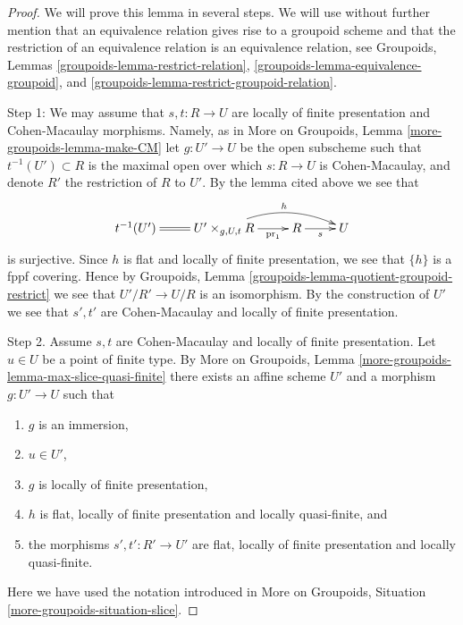 \begin{proof}
We will prove this lemma in several steps. We will use without further
mention that an equivalence relation gives rise to a groupoid scheme
and that the restriction of an equivalence relation is an equivalence
relation, see
Groupoids, Lemmas
\ref{groupoids-lemma-restrict-relation},
\ref{groupoids-lemma-equivalence-groupoid}, and
\ref{groupoids-lemma-restrict-groupoid-relation}.

\medskip\noindent
Step 1: We may assume that $s, t : R \to U$ are locally of finite presentation
and Cohen-Macaulay morphisms. Namely, as in
More on Groupoids, Lemma \ref{more-groupoids-lemma-make-CM}
let $g : U' \to U$ be the open subscheme such that
$t^{-1}(U') \subset R$ is the maximal open over which $s : R \to U$ is
Cohen-Macaulay, and denote $R'$ the restriction of $R$ to $U'$.
By the lemma cited above we see that
$$
\xymatrix{
t^{-1}(U') \ar@{=}[r] &
U' \times_{g, U, t} R \ar[r]_-{\text{pr}_1} \ar@/^3ex/[rr]^h &
R \ar[r]_s &
U
}
$$
is surjective. Since $h$ is flat and locally of finite presentation, we
see that $\{h\}$ is a fppf covering. Hence by
Groupoids, Lemma \ref{groupoids-lemma-quotient-groupoid-restrict}
we see that $U'/R' \to U/R$ is an isomorphism. By the construction of $U'$
we see that $s', t'$ are Cohen-Macaulay and locally of finite presentation.

\medskip\noindent
Step 2. Assume $s, t$ are Cohen-Macaulay and locally of finite presentation.
Let $u \in U$ be a point of finite type. By
More on Groupoids, Lemma \ref{more-groupoids-lemma-max-slice-quasi-finite}
there exists an affine scheme $U'$ and a morphism $g : U' \to U$ such that
\begin{enumerate}
\item $g$ is an immersion,
\item $u \in U'$,
\item $g$ is locally of finite presentation,
\item $h$ is flat, locally of finite presentation and locally quasi-finite, and
\item the morphisms $s', t' : R' \to U'$ are flat, locally of finite
presentation and locally quasi-finite.
\end{enumerate}
Here we have used the notation introduced in
More on Groupoids, Situation \ref{more-groupoids-situation-slice}.


\end{proof}
